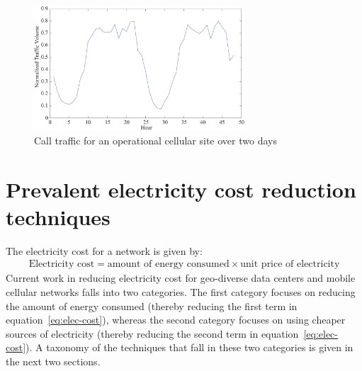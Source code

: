 \begin{figure}
\centering
\includegraphics[width=0.7\textwidth]{pics/waridworkload.eps}
\caption{Call traffic for an operational cellular site over two days}
\label{fig:varwork}
\end{figure} 

\section{Prevalent electricity cost reduction techniques} %

The electricity cost for a network is given by:
\begin{align}
\text{Electricity cost} = \text{amount of energy consumed} \times \text{unit price of electricity}
\label{eq:elec-cost}
\end{align}
Current work in reducing electricity cost for geo-diverse data centers and mobile cellular networks falls into two categories. The first category focuses on reducing the amount of energy consumed (thereby reducing the first term in equation~\ref{eq:elec-cost}), whereas the second category focuses on using cheaper sources of electricity (thereby reducing the second term in equation~\ref{eq:elec-cost}). A taxonomy of the techniques that fall in these two categories is given in the next two sections.

